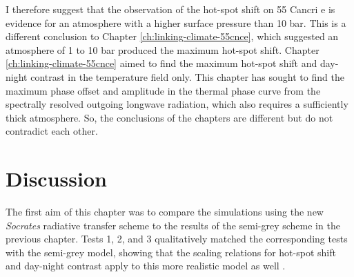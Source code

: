 I therefore suggest that the observation of the hot-spot shift on 55 Cancri e is evidence for an atmosphere with a higher surface pressure than 10 bar. This is a different conclusion to Chapter \ref{ch:linking-climate-55cnce}, which suggested an atmosphere of 1 to 10 bar produced the maximum hot-spot shift. Chapter \ref{ch:linking-climate-55cnce} aimed to find the maximum hot-spot shift and day-night contrast in the temperature field only. This chapter has sought to find the maximum phase offset and amplitude in the thermal phase curve from the spectrally resolved outgoing longwave radiation, which also requires a sufficiently thick atmosphere. So, the conclusions of the chapters are different but do not contradict each other.


%



\section{Discussion}\label{sec:soc-lava-discussion}


The first aim of this chapter was to compare the simulations using the new \textit{Socrates} radiative transfer scheme to the results of the semi-grey scheme in the previous chapter. Tests 1, 2, and 3 qualitatively matched the corresponding tests with the semi-grey model, showing that the scaling relations for hot-spot shift and day-night contrast apply to this more realistic model as well \citep{zhang2017dynamics}.

